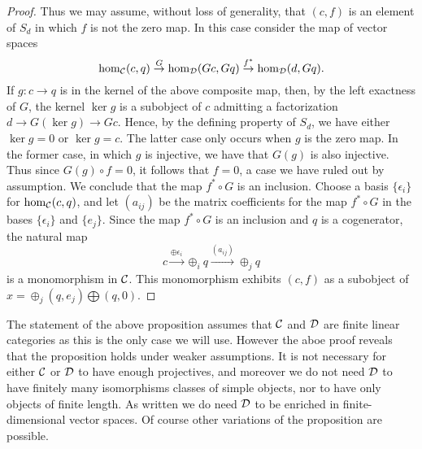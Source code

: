 \documentclass{amsart}
\begin{document}
\begin{proof}
Thus we may assume, without loss of generality, that  $(c, f)$ is an element of $S_d$ in which $f$ is not the zero map. In this case consider the map of vector spaces
\begin{equation*}
	\hom_{\mathcal C}(c,q) \stackrel{G}{\to} \hom_{\mathcal D}(G c, G q) \stackrel{f^*}{\to} \hom_{\mathcal D}(d, G q).
\end{equation*} 
If $g: c \to q$ is in the kernel of the above composite map, then, by the left exactness of $G$, the kernel $\ker g$ is a subobject of $c$ admitting a factorization $d \to G(\ker g) \to G c$. Hence, by the defining property of $S_d$, we have either $\ker g = 0$ or $\ker g = c$. The latter case only occurs when $g$ is the zero map. In the former case, in which $g$ is injective, we have that $G(g)$ is also injective. Thus since $G(g) \circ f = 0$, it follows that $f = 0$, a case we have ruled out by assumption. We conclude that the map $f^* \circ G$ is an inclusion. Choose a basis  $\{ \epsilon_i \}$ for $\hom_{\mathcal C}(c,q)$, and let $(a_{ij})$ be the matrix coefficients for the map $f^* \circ G$ in the bases $\{ \epsilon_i \}$ and $\{ e_j \}$. Since the map $f^* \circ G$ is an inclusion and $q$ is a cogenerator, the natural map
\begin{equation*}
	c \stackrel{\oplus \epsilon_i}{\to} \oplus_i q \stackrel{(a_{ij}) }{\to} \oplus_j q
\end{equation*} 
is a monomorphism in $\mathcal C$. This monomorphism exhibits $(c,f)$ as a subobject of $x = \oplus_j( q, e_j) \bigoplus (q,0)$. 
\end{proof}

\begin{remark}
	The statement of the above proposition assumes that $\mathcal C$ and $\mathcal D$ are finite linear categories as this is the only case we will use. However the aboe proof reveals that the proposition holds under weaker assumptions. It is not necessary for either $\mathcal C$ or $\mathcal D$ to have enough projectives, and moreover we do not need $\mathcal D$ to have finitely many isomorphisms classes of simple objects, nor to have only objects of finite length. As written we do need $\mathcal D$ to be enriched in finite-dimensional vector spaces. Of course other variations of the proposition are possible. 
\end{remark}
\end{document}
